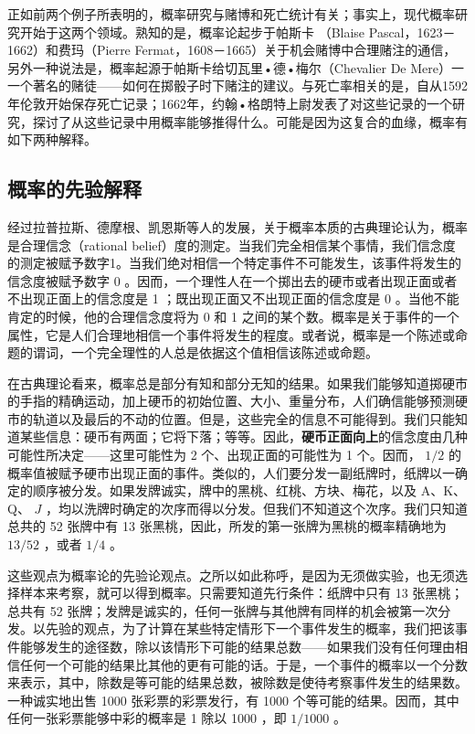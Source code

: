 正如前两个例子所表明的，概率研究与赌博和死亡统计有关；事实上，现代概率研究开始于这两个领域。熟知的是，概率论起步于帕斯卡 （Blaise Pascal，1623－1662）和费玛（Pierre Fermat，1608－1665）关于机会赌博中合理赌注的通信，另外一种说法是，概率起源于帕斯卡给切瓦里•德•梅尔（Chevalier De Mere）一一个著名的赌徒——如何在掷骰子时下赌注的建议。与死亡率相关的是，自从1592年伦敦开始保存死亡记录；1662年，约翰•格朗特上尉发表了对这些记录的一个研究，探讨了从这些记录中用概率能够推得什么。可能是因为这复合的血缘，概率有如下两种解释。

\subsection{概率的先验解释}

经过拉普拉斯、德摩根、凯恩斯等人的发展，关于概率本质的古典理论认为，概率是合理信念（rational belief）度的测定。当我们完全相信某个事情，我们信念度的测定被赋予数字1。当我们绝对相信一个特定事件不可能发生，该事件将发生的信念度被赋予数字 0 。因而，一个理性人在一个掷出去的硬市或者出现正面或者不出现正面上的信念度是 1 ；既出现正面又不出现正面的信念度是 0 。当他不能肯定的时候，他的合理信念度将为 0 和 1 之间的某个数。概率是关于事件的一个属性，它是人们合理地相信一个事件将发生的程度。或者说，概率是一个陈述或命题的谓词，一个完全理性的人总是依据这个值相信该陈述或命题。

在古典理论看来，概率总是部分有知和部分无知的结果。如果我们能够知道掷硬市的手指的精确运动，加上硬币的初始位置、大小、重量分布，人们确信能够预测硬市的轨道以及最后的不动的位置。但是，这些完全的信息不可能得到。我们只能知道某些信息：硬币有两面；它将下落；等等。因此，\textbf{硬币正面向上}的信念度由几种可能性所决定——这里可能性为 2 个、出现正面的可能性为 1 个。因而， $1 / 2$ 的概率值被赋予硬市出现正面的事件。类似的，人们要分发一副纸牌时，纸牌以一确定的顺序被分发。如果发牌诚实，牌中的黑桃、红桃、方块、梅花，以及 A、K、Q、 $J$ ，均以洗牌时确定的次序而得以分发。但我们不知道这个次序。我们只知道总共的 52 张牌中有 13 张黑桃，因此，所发的第一张牌为黑桃的概率精确地为 $13 / 52$ ，或者 $1 / 4$ 。

这些观点为概率论的先验论观点。之所以如此称呼，是因为无须做实验，也无须选择样本来考察，就可以得到概率。只需要知道先行条件：纸牌中只有 13 张黑桃；总共有 52 张牌；发牌是诚实的，任何一张牌与其他牌有同样的机会被第一次分发。以先验的观点，为了计算在某些特定情形下一个事件发生的概率，我们把该事件能够发生的途径数，除以该情形下可能的结果总数——如果我们没有任何理由相信任何一个可能的结果比其他的更有可能的话。于是，一个事件的概率以一个分数来表示，其中，除数是等可能的结果总数，被除数是使待考察事件发生的结果数。一种诚实地出售 1000 张彩票的彩票发行，有 1000 个等可能的结果。因而，其中任何一张彩票能够中彩的概率是 1 除以 1000 ，即 $1 / 1000$ 。


